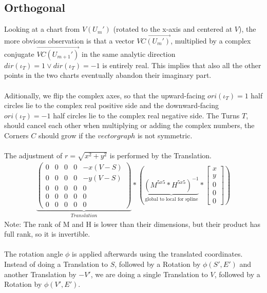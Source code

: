 \documentclass{report}
\begin{document}
\subsection{Orthogonal}
Looking at a chart from $V(U_{m}')$ (rotated to the x-axis and centered at $V$), the more obvious observation is that a vector $\overrightarrow{VC(U_{m}')}$, multiplied by a complex conjugate $\overrightarrow{VC(U_{m+1}')}$ in the same analytic direction $dir(\iota_{T})=1\lor dir(\iota_{T})=-1$ is entirely real. This implies that also all the other points in the two charts eventually abandon their imaginary part.\\\\
Aditionally, we flip the complex axes, so that the upward-facing $ori(\iota_{T})=1$ half circles lie to the complex real positive side and the downward-facing $ori(\iota_{T})=-1$ half circles lie to the complex real negative side. The Turns $T$, should cancel each other when multiplying or adding the complex numbers, the Corners $C$ should grow if the $vectorgraph$ is not symmetric.\\\\
The adjustment of $r=\sqrt{x^2+y^2}$ is performed by the Translation. 
\begin{align}
\underbrace{
\begin{pmatrix}
0 & 0 & 0 & 0 & -x(V-S) \\
0 & 0 & 0 & 0 & -y(V-S) \\
0 & 0 & 0 & 0 & 0 \\
0 & 0 & 0 & 0 & 0 \\
0 & 0 & 0 & 0 & 0
\end{pmatrix}
}_{Translation}
*(
\underbrace{
(M^{5x5} * H^{5x5})^{-1}
}_{\text{global to local for spline}}
*\begin{bmatrix} x \\ y \\ 0 \\ 0 \\ 0 \end{bmatrix})
\end{align}
Note: The rank of M and H is lower than their dimensions, but their product has full rank, so it is invertible.\\\\
The rotation angle $\phi$ is applied afterwards using the translated coordinates. Instead of doing a Translation to $S$, followed by a Rotation by $\phi(S',E')$ and another Translation by $-V'$, we are doing a single Translation to $V$, followed by a Rotation by $\phi(V',E')$.\\
\end{document}
